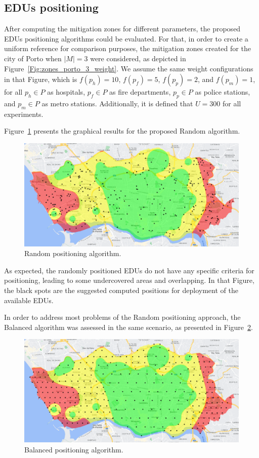 \begin{refsection}
\subsection{EDUs positioning}

After computing the mitigation zones for different parameters, the proposed EDUs positioning algorithms could be evaluated. For that, in order to create a uniform reference for comparison purposes, the mitigation zones created for the city of Porto when $|M|=3$ were considered, as depicted in Figure~\ref{Fig:zones_porto_3_weight}. We assume the same weight configurations in that Figure, which is $f(p_h)=10$, $f(p_f)=5$, $f(p_p)=2$, and $f(p_m)=1$, for all $p_h \in P$ as hospitals, $p_f \in P$ as fire departments, $p_p \in P$ as police stations, and $p_m \in P$ as metro stations. Additionally, it is defined that $U=300$ for all experiments.

Figure~\ref{Fig:edus_random} presents the graphical results for the proposed Random algorithm.

\begin{figure}[htbp!]
  \centering
  \includegraphics[width=0.9\linewidth]{Chapters/3-EDUs/images/porto_M3_random.png}
  \caption{Random positioning algorithm.}\label{Fig:edus_random}
\end{figure}

As expected, the randomly positioned EDUs do not have any specific criteria for positioning, leading to some undercovered areas and overlapping. In that Figure, the black spots are the suggested computed positions for deployment of the available EDUs.

In order to address most problems of the Random positioning approach, the Balanced algorithm was assessed in the same scenario, as presented in Figure~\ref{Fig:edus_balanced}.

\begin{figure}[htbp!]
  \centering
  \includegraphics[width=0.9\linewidth]{Chapters/3-EDUs/images/porto_M3_balanced.png}
  \caption{Balanced positioning algorithm.}\label{Fig:edus_balanced}
\end{figure}


\end{refsection}
